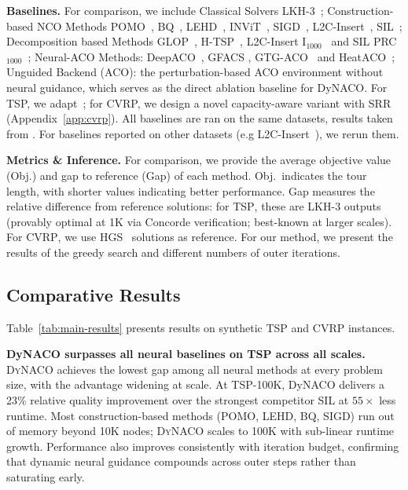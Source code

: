 \documentclass[sigconf,review]{acmart}
\newcommand{\TSP}{\textsc{TSP}}
\newcommand{\CVRP}{\textsc{CVRP}}
\newcommand{\DyNACO}{\textsc{DyNACO}}
\begin{document}
\smallskip\noindent\textbf{Baselines.}
For comparison, we include Classical Solvers LKH-3~\cite{lkhtsp, lkhcvrp}; Construction-based NCO Methods POMO~\cite{pomo}, BQ~\cite{bq}, LEHD~\cite{lehd}, INViT~\cite{invit}, SIGD~\cite{sigd}, L2C-Insert~\cite{l2c}, SIL~\cite{sil}; Decomposition based Methods GLOP~\cite{glop}, H-TSP~\cite{htsp}, L2C-Insert I$_{1000}$~\cite{l2c} and SIL PRC$_{1000}$~\cite{sil}; Neural-ACO Methods: DeepACO~\cite{deepaco}, GFACS \cite{gfacs}, GTG-ACO~\cite{gtgaco} and HeatACO~\cite{heataco}; Unguided Backend (ACO): the perturbation-based ACO environment without neural guidance, which serves as the direct ablation baseline for DyNACO. For TSP, we adapt~\cite{faco}; for CVRP, we design a novel capacity-aware variant with SRR (Appendix~\ref{app:cvrp}).
All baselines are ran on the same datasets, results taken from \cite{l2c, sil}. For baselines reported on other datasets (e.g L2C-Insert~\cite{l2c}), we rerun them.

\smallskip\noindent\textbf{Metrics \& Inference.}
For comparison, we provide the average objective value (Obj.) and gap to reference (Gap) of each method. Obj.\ indicates the tour length, with shorter values indicating better performance. Gap measures the relative difference from reference solutions: for \TSP{}, these are LKH-3 outputs (provably optimal at 1K via Concorde verification; best-known at larger scales). For \CVRP{}, we use HGS~\cite{hgs} solutions as reference.
For our method, we present the results of the greedy search and different numbers of outer iterations.

\subsection{Comparative Results}
\label{sec:main-results}

Table~\ref{tab:main-results} presents results on synthetic \TSP{} and \CVRP{} instances.

\smallskip\noindent\textbf{DyNACO surpasses all neural baselines on TSP across all scales.}
\DyNACO{} achieves the lowest gap among all neural methods at every problem size, with the advantage widening at scale.
At TSP-100K, DyNACO delivers a 23\% relative quality improvement over the strongest competitor SIL at $55{\times}$ less runtime.
Most construction-based methods (POMO, LEHD, BQ, SIGD) run out of memory beyond 10K nodes; \DyNACO{} scales to 100K with sub-linear runtime growth.
Performance also improves consistently with iteration budget, confirming that dynamic neural guidance compounds across outer steps rather than saturating early.
\end{document}
